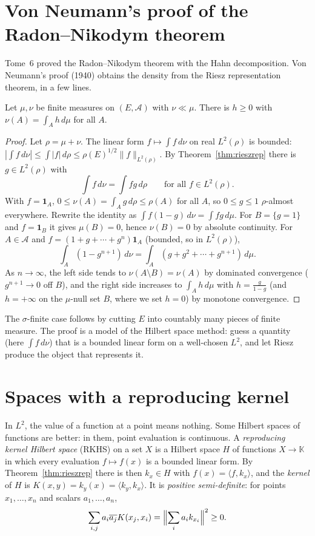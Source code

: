 \section{Von Neumann's proof of the Radon--Nikodym theorem}

Tome~6 proved the Radon--Nikodym theorem with the Hahn decomposition. Von Neumann's proof (1940) obtains the density from the Riesz representation theorem, in a few lines.

\begin{theorem}\label{thm:rnvn}
Let $\mu,\nu$ be finite measures on $(E,\mathcal A)$ with $\nu\ll\mu$. There is $h\ge0$ with $\nu(A)=\int_Ah\,d\mu$ for all $A$.
\end{theorem}
\begin{proof}
Let $\rho=\mu+\nu$. The linear form $f\mapsto\int f\,d\nu$ on real $L^2(\rho)$ is bounded: $|\int f\,d\nu|\le\int|f|\,d\rho\le\rho(E)^{1/2}\|f\|_{L^2(\rho)}$. By Theorem~\ref{thm:rieszrep} there is $g\in L^2(\rho)$ with
\[\int f\,d\nu=\int fg\,d\rho\qquad\text{for all }f\in L^2(\rho).\]
With $f=\mathbf 1_A$, $0\le\nu(A)=\int_Ag\,d\rho\le\rho(A)$ for all $A$, so $0\le g\le1$ $\rho$-almost everywhere. Rewrite the identity as $\int f(1-g)\,d\nu=\int fg\,d\mu$. For $B=\{g=1\}$ and $f=\mathbf 1_B$ it gives $\mu(B)=0$,
hence $\nu(B)=0$ by absolute continuity. For $A\in\mathcal A$ and $f=(1+g+\cdots+g^n)\mathbf 1_A$ (bounded, so in $L^2(\rho)$),
\[\int_A(1-g^{n+1})\,d\nu=\int_A(g+g^2+\cdots+g^{n+1})\,d\mu.\]
As $n\to\infty$, the left side tends to $\nu(A\setminus B)=\nu(A)$ by dominated convergence ($g^{n+1}\to0$ off $B$), and the right side increases to $\int_Ah\,d\mu$ with $h=\frac g{1-g}$ (and $h=+\infty$ on the $\mu$-null set $B$, where
we set $h=0$) by monotone convergence.
\end{proof}

The $\sigma$-finite case follows by cutting $E$ into countably many pieces of finite measure. The proof is a model of the Hilbert space method: guess a quantity (here $\int f\,d\nu$) that is a bounded linear form on a well-chosen
$L^2$, and let Riesz produce the object that represents it.

\section{Spaces with a reproducing kernel}

In $L^2$, the value of a function at a point means nothing. Some Hilbert spaces of functions are better: in them, point evaluation is continuous. A \emph{reproducing kernel Hilbert space} (RKHS) on a set $X$ is a Hilbert space $H$ of
functions $X\to\mathbb K$ in which every evaluation $f\mapsto f(x)$ is a bounded linear form. By Theorem~\ref{thm:rieszrep} there is then $k_x\in H$ with $f(x)=\langle f,k_x\rangle$, and the \emph{kernel} of $H$ is
$K(x,y)=k_y(x)=\langle k_y,k_x\rangle$. It is \emph{positive semi-definite}: for points $x_1,\dots,x_n$ and scalars $a_1,\dots,a_n$,
\[\sum_{i,j}a_i\overline{a_j}K(x_j,x_i)=\Bigl\|\sum_ia_ik_{x_i}\Bigr\|^2\ge0.\]

